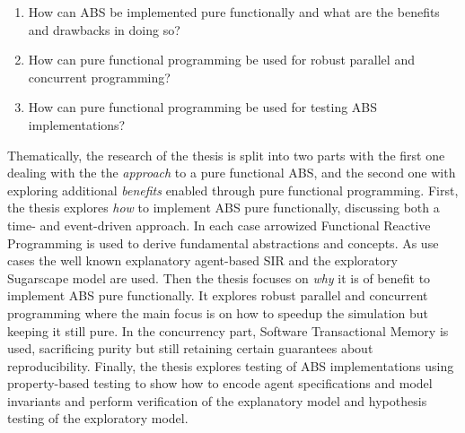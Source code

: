 %
%

\begin{enumerate}
	\item How can ABS be implemented pure functionally and what are the benefits and drawbacks in doing so?
	\item How can pure functional programming be used for robust parallel and concurrent programming? 
	\item How can pure functional programming be used for testing ABS implementations?
\end{enumerate}

Thematically, the research of the thesis is split into two parts with the first one dealing with the the \textit{approach} to a pure functional ABS, and the second one with exploring additional \textit{benefits} enabled through pure functional programming.
First, the thesis explores \textit{how} to implement ABS pure functionally, discussing both a time- and event-driven approach. In each case arrowized Functional Reactive Programming is used to derive fundamental abstractions and concepts. As use cases the well known explanatory agent-based SIR and the exploratory Sugarscape model are used. Then the thesis focuses on \textit{why} it is of benefit to implement ABS pure functionally. It explores robust parallel and concurrent programming where the main focus is on how to speedup the simulation but keeping it still pure. In the concurrency part, Software Transactional Memory is used, sacrificing purity but still retaining certain guarantees about reproducibility. Finally, the thesis explores testing of ABS implementations using property-based testing to show how to encode agent specifications and model invariants and perform verification of the explanatory model and hypothesis testing of the exploratory model.


